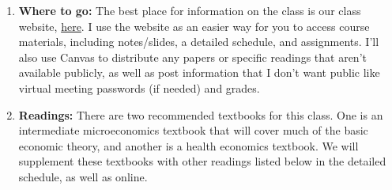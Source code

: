 \documentclass[11pt,]{article}
\begin{document}
\begin{enumerate}
\def\labelenumi{\arabic{enumi}.}
\item
  \textbf{Where to go:} The best place for information on the class is
  our class website,
  \href{https://econ372s23.classes.ianmccarthyecon.com/}{here}. I use
  the website as an easier way for you to access course materials,
  including notes/slides, a detailed schedule, and assignments. I'll
  also use Canvas to distribute any papers or specific readings that
  aren't available publicly, as well as post information that I don't
  want public like virtual meeting passwords (if needed) and grades.
\item
  \textbf{Readings:} There are two recommended textbooks for this class.
  One is an intermediate microeconomics textbook that will cover much of
  the basic economic theory, and another is a health economics textbook.
  We will supplement these textbooks with other readings listed below in
  the detailed schedule, as well as online.


\end{enumerate}
\end{document}
